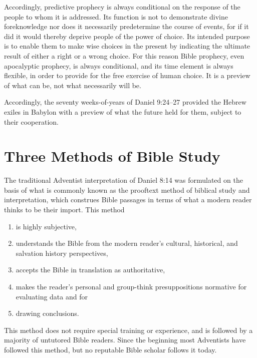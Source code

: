 Accordingly, predictive prophecy is always conditional on the response of
the people to whom it is addressed. Its function is not to demonstrate
divine foreknowledge nor does it necessarily predetermine the course of
events, for if it did it would thereby deprive people of the power of
choice. Its intended purpose is to enable them to make wise choices in the
present by indicating the ultimate result of either a right or a wrong
choice. For this reason Bible prophecy, even apocalyptic prophecy, is always
conditional, and its time element is always flexible, in order to provide
for the free exercise of human choice. It is a preview of what can be, not
what necessarily will be.

Accordingly, the seventy weeks-of-years of Daniel 9:24--27 provided the
Hebrew exiles in Babylon with a preview of what the future held for them, 
subject to their cooperation.

\section{Three Methods of Bible Study}

The traditional Adventist interpretation of Daniel 8:14 was formulated on
the basis of what is commonly known as the prooftext method of biblical
study and interpretation, which construes Bible passages in terms of what a
modern reader thinks to be their import. This method
\begin{enumerate}
    \item is highly
subjective,
    \item understands the Bible from the modern reader's cultural,
historical, and salvation history perspectives,
    \item accepts the Bible in
translation as authoritative,
    \item makes the reader's personal and
group-think presuppositions normative for evaluating data and for
    \item
drawing conclusions.
\end{enumerate}
This method does not require special training or
experience, and is followed by a majority of untutored Bible readers. Since
the beginning most Adventists have followed this method, but no reputable
Bible scholar follows it today. 

